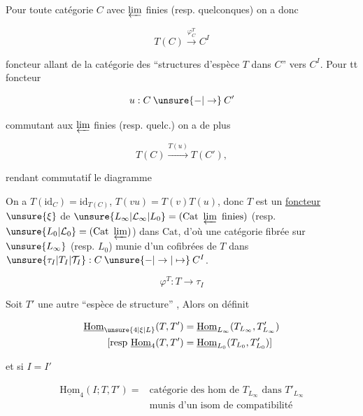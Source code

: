 Pour toute catégorie $C$ avec $\varprojlim$ finies (resp. quelconques)
on a donc

\[
T(C)\xrightarrow{\varphi_C^T}C^I
\]

foncteur  allant de la catégorie des ``structures d'espèce
$T$ dans $C$'' vers $C^I$. Pour tt foncteur

\[
u:C\mathbin{\unsure{-|\to}}C'
\]

commutant aux $\varprojlim$ finies (resp. quelc.) on a de plus

\[
T(C)\xrightarrow{T(u)}T(C'),
\]

rendant commutatif le diagramme


On a $T(\mathrm{id}_C)=\mathrm{id}_{T(C)}$, $T(vu)=T(v)T(u)$, donc $T$ est un
\uline{foncteur} $\unsure{\xi}$ de $\unsure{L_\infty|\mathcal L_\infty|L_0}=(\mathrm{Cat}\ \varprojlim\ \mathrm{finies})$ (resp. $\unsure{L_0|\mathcal L_0}=(\mathrm{Cat}\ \varprojlim)$) dans
$\mathrm{Cat}$, d'où  une catégorie fibrée  sur $\unsure{L_\infty}$ (resp. $L_0$)
munie d'un  cofibrées de $T$ dans  $\unsure{\tau_I|T_I|\mathcal T_I}:C\mathbin{\unsure{-|\to|\mapsto}}C^I$.

\[
\varphi^T:T\longrightarrow \tau_I
\]

 Soit $T'$ une autre ``espèce de structure'' , Alors on définit

\[
\begin{aligned}
\underline{\mathrm{Hom}}_{\unsure{4|\xi|L}}(T,T')&=\underline{\mathrm{Hom}}_{L_\infty}(T_{L_\infty},T'_{L_\infty})\\
{}[\text{resp }\underline{\mathrm{Hom}}_{4}(T,T')&=\underline{\mathrm{Hom}}_{L_0}(T_{L_0},T'_{L_0})]
\end{aligned}
\]

et si $I=I'$

\[
\begin{aligned}
\underline{\mathrm{Hom}}_{4}(I;T,T')={}&\text{catégorie des hom de }T_{L_\infty}\text{ dans }T'_{L_\infty}\\
&\text{munis d'un isom de compatibilité}
\end{aligned}
\]


